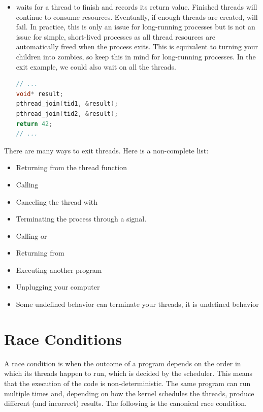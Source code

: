 \begin{itemize}
\begin{lstlisting}[language=C]
  // No code is run after exit
}
\end{lstlisting}

\item {} waits for a thread to finish and records its return value.
Finished threads will continue to consume resources.
Eventually, if enough threads are created,  will fail.
In practice, this is only an issue for long-running processes but is not an issue for simple, short-lived processes as all thread resources are automatically freed when the process exits.
This is equivalent to turning your children into zombies, so keep this in mind for long-running processes. In the exit example, we could also wait on all the threads.

\begin{lstlisting}[language=C]
// ...
void* result;
pthread_join(tid1, &result);
pthread_join(tid2, &result);
return 42;
// ...
\end{lstlisting}


\end{itemize}

There are many ways to exit threads.
Here is a non-complete list:

\begin{itemize}
\item Returning from the thread function
\item Calling 
\item Canceling the thread with 
\item Terminating the process through a signal.
\item Calling  or 
\item Returning from 
\item Executing another program
\item Unplugging your computer
\item Some undefined behavior can terminate your threads, it is undefined behavior
\end{itemize}

\section{Race Conditions}

A race condition is when the outcome of a program depends on the order in which its threads happen to run, which is decided by the scheduler.
This means that the execution of the code is non-deterministic.
The same program can run multiple times and, depending on how the kernel schedules the threads, produce different (and incorrect) results.
The following is the canonical race condition.

